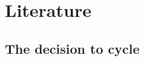 \documentclass[11pt]{article} %
\begin{document}
%
%
%
%
%
%
%
%
%
%
%
%


\section{Literature}

\subsection{The decision to cycle}
\end{document}
